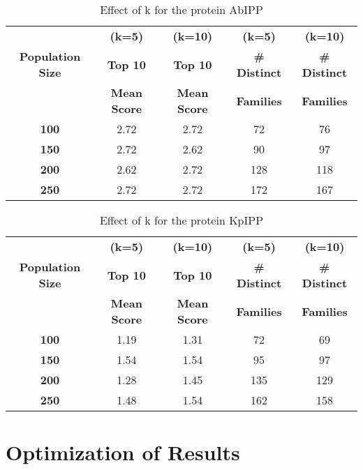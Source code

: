 \begin{table}[htbp]
\begin{center}

\caption{Effect of k for the protein AbIPP}
\begin{tabular}{|c|c|c|c|c|}
\hline
  & \textbf{(k=5)} & \textbf{(k=10)} & \textbf{(k=5)} & \textbf{(k=10)} \\
\textbf{Population Size} & \textbf{Top 10} & \textbf{Top 10} & \textbf{\# Distinct} & \textbf{\# Distinct} \\
 & \textbf{Mean Score} & \textbf{Mean Score} & \textbf{Families} & \textbf{Families} \\
\hline
\textbf{100}& 2.72 & 2.72 & 72 &  76 \\
\hline
\textbf{150}& 2.72 & 2.62 & 90 &  97 \\
\hline
\textbf{200}& 2.62 & 2.72 & 128 &  118 \\
\hline
\textbf{250}& 2.72 & 2.72 & 172 &  167 \\
\hline
\end{tabular}
\label{abipp_k}

\end{center}
\end{table}

\begin{table}[htbp]
\begin{center}

\caption{Effect of k  for the protein KpIPP}
\begin{tabular}{|c|c|c|c|c|}
\hline
  & \textbf{(k=5)} & \textbf{(k=10)} & \textbf{(k=5)} & \textbf{(k=10)} \\
\textbf{Population Size} & \textbf{Top 10} & \textbf{Top 10} & \textbf{\# Distinct} & \textbf{\# Distinct} \\
 & \textbf{Mean Score} & \textbf{Mean Score} & \textbf{Families} & \textbf{Families} \\
\hline
\textbf{100}& 1.19 & 1.31 & 72 &  69 \\
\hline
\textbf{150}& 1.54 & 1.54 & 95 &  97 \\
\hline
\textbf{200}& 1.28 & 1.45 & 135 &  129 \\
\hline
\textbf{250}& 1.48 & 1.54 & 162 &  158 \\
\hline
\end{tabular}
\label{kpipp_k}

\end{center}
\end{table}

\section{Optimization of Results}\label{sec:GA-optimization}


